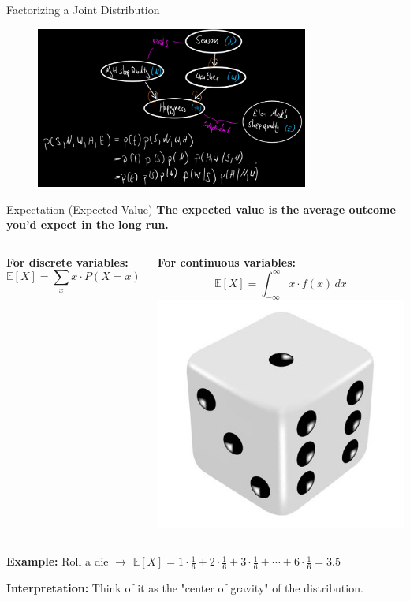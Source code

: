 \documentclass[handout,aspectratio=169]{beamer}
\begin{document}
\begin{frame}{Factorizing a Joint Distribution}
    \begin{figure}[htbp]
		\centering
		\includegraphics[width=0.8\textwidth]{chapter_figs/01_figs/factorization.png}
	\end{figure}
\end{frame}

\begin{frame}{Expectation (Expected Value)}
  \textbf{The expected value is the average outcome you'd expect in the long run.}
\vspace{1em}
    \begin{columns}
    
  \textbf{For discrete variables:}
  \[
    \mathbb{E}[X] = \sum_x x \cdot P(X = x)
  \]

  \textbf{For continuous variables:}
  \[
    \mathbb{E}[X] = \int_{-\infty}^{\infty} x \cdot f(x) \, dx
  \]
    \includegraphics[width=0.5\linewidth]{chapter_figs/01_figs/dice.png}
\end{columns}

  

  \vspace{1em}
  \textbf{Example:} Roll a die $\rightarrow$ $\mathbb{E}[X] = 1\cdot \frac{1}{6} + 2\cdot \frac{1}{6} + 3\cdot \frac{1}{6} + \cdots + 6 \cdot \frac{1}{6} = 3.5$

  \vspace{1em}
  \textbf{Interpretation:} Think of it as the "center of gravity" of the distribution.
\end{frame}
\end{document}
